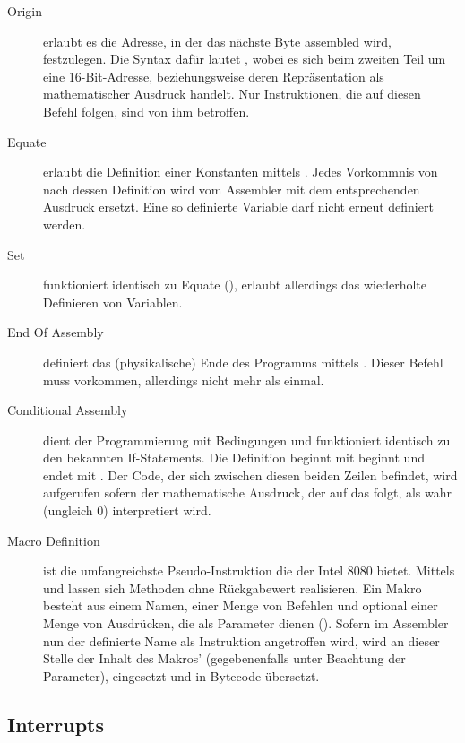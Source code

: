 \begin{description}
\item[Origin] erlaubt es die Adresse, in der das nächste Byte assembled wird, festzulegen. Die Syntax dafür lautet , wobei es sich beim zweiten Teil um eine 16-Bit-Adresse, beziehungsweise deren Repräsentation als mathematischer Ausdruck handelt. Nur Instruktionen, die auf diesen Befehl folgen, sind von ihm betroffen.

\item[Equate] erlaubt die Definition einer Konstanten mittels . Jedes Vorkommnis von  nach dessen Definition wird vom Assembler mit dem entsprechenden Ausdruck ersetzt. Eine so definierte Variable darf nicht erneut definiert werden.

\item[Set] funktioniert identisch zu Equate (), erlaubt allerdings das wiederholte Definieren von Variablen.

\item[End Of Assembly] definiert das (physikalische) Ende des Programms mittels . Dieser Befehl muss vorkommen, allerdings nicht mehr als einmal.

\item[Conditional Assembly] dient der Programmierung mit Bedingungen und funktioniert identisch zu den bekannten If-Statements. Die Definition beginnt mit  beginnt und endet mit . Der Code, der sich zwischen diesen beiden Zeilen befindet, wird aufgerufen sofern der mathematische Ausdruck, der auf das  folgt, als wahr (ungleich 0) interpretiert wird.

\item[Macro Definition] ist die umfangreichste Pseudo-Instruktion die der Intel 8080 bietet. Mittels  und  lassen sich Methoden ohne Rückgabewert realisieren. Ein Makro besteht aus einem Namen, einer Menge von Befehlen und optional einer Menge von Ausdrücken, die als Parameter dienen (). Sofern im Assembler nun der definierte Name als Instruktion angetroffen wird, wird an dieser Stelle der Inhalt des Makros' (gegebenenfalls unter Beachtung der Parameter), eingesetzt und in Bytecode übersetzt.
\end{description}

\subsection{Interrupts}

